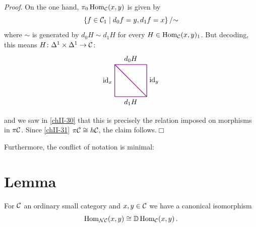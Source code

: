         \emph{Proof}. On the one hand, $\pi_0 \operatorname{Hom}_{\mathcal{C}}(x, y)$ is given by
        \begin{equation*}
            \left\{ f \in \mathcal{C}_1 \mid d_0 f = y, d_1 f = x \right\} / {\sim}
        \end{equation*}
        where $\sim$ is generated by $d_0 H \sim d_1 H$ for every $H \in \operatorname{Hom}_{\mathcal{C}}(x, y)_1$. But decoding, this means $H \colon \Delta^1 \times \Delta^1 \to \mathcal{C}$:
        \begin{equation*}
            \begin{tikzpicture}[
                scale=0.8, 
                thick, 
                color=violet, 
                every node/.style={text=black}
            ]

                \coordinate (TL) at (0,2); %
                \coordinate (TR) at (2,2); %
                \coordinate (BL) at (0,0); %
                \coordinate (BR) at (2,0); %

                \draw (TL) -- node[above] {$d_0 H$} (TR);
                \draw (BL) -- node[below] {$d_1 H$} (BR);
    
                \draw (BL) -- node[left] {$\id_x$} (TL);
                \draw (BR) -- node[right] {$\id_y$} (TR);

                \draw (TL) -- node[sloped, below] {} (BR);

            \end{tikzpicture}          
        \end{equation*}
        and we saw in \ref{chII-30} that this is precisely the relation imposed on morphisms in $\pi \mathcal{C}$. Since \ref{chII-31} $\pi \mathcal{C} \cong h \mathcal{C}$, the claim follows.\hfill$\Box$
        \medskip

        Furthermore, the conflict of notation is minimal:

        \section{Lemma}
        For $\mathcal{C}$ an ordinary small category and $x, y \in \mathcal{C}$ we have a canonical isomorphism
        \begin{equation*}
            \operatorname{Hom}_{\mathcal{N} \mathcal{C}}(x, y) \cong \mathbb{D} \operatorname{Hom}_{\mathcal{C}}(x, y) \,.
        \end{equation*}

